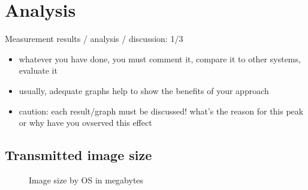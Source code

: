 \chapter{Analysis}

Measurement results / analysis / discussion: 1/3

\begin{itemize}
\item whatever you have done, you must comment it, compare it to other systems, evaluate it
\item usually, adequate graphs help to show the benefits of your approach
\item caution: each result/graph must be discussed! what's the reason for this peak or why have you ovserved this effect
\end{itemize}

\section{Transmitted image size}
\begin{figure}[H]
\centering
{}
\caption{Image size by OS in megabytes}
\end{figure}
\clearpage
